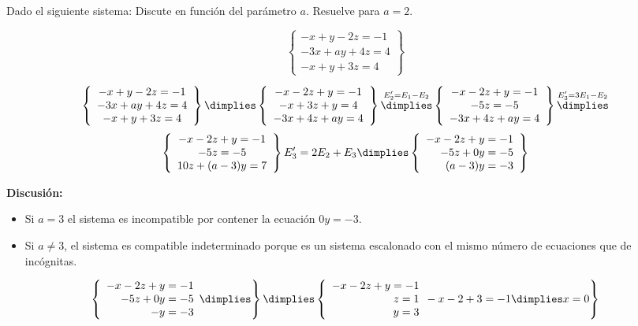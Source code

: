 \documentclass[palatino,nosec,nochap,nobuilddate]{Docencia}
\begin{document}
\begin{problem}
Dado el siguiente sistema:
\ppart Discute en función del parámetro $a$.
\ppart Resuelve para $a=2$.

\[
\left\{
	\begin{array}{c}
		-x+y-2z=-1\\
		-3x+ay+4z=4\\
		-x+y+3z=4
	\end{array}
\right\}
\]

\solution
\spart 
\[
\left\{
	\begin{array}{c}
		-x+y-2z=-1\\
		-3x+ay+4z=4\\
		-x+y+3z=4
	\end{array}
\right\}\dimplies
\left\{
	\begin{array}{c}
		-x-2z+y=-1\\
		-x+3z+y=4\\
		-3x+4z+ay=4
	\end{array}
\right\}\overset{E_2' = E_1-E_2}{\dimplies}
\left\{
	\begin{array}{c}
		-x-2z+y=-1\\
		-5z=-5\\
		-3x+4z+ay=4
	\end{array}
\right\}\overset{E_3' = 3E_1-E_2}{\dimplies}
\]
\[
\left\{
	\begin{array}{c}
		-x-2z+y=-1\\
		-5z=-5\\
		10z+(a-3)y=7
	\end{array}
\right\}{E_3' = 2E_2+E_3}{\dimplies}
\left\{
	\begin{array}{r}
		-x-2z+y=-1\\
		-5z+0y=-5\\
		(a-3)y=-3
	\end{array}
\right\}
\]

\textbf{Discusión:}
\begin{itemize}
	\item Si $a=3$ el sistema es incompatible por contener la ecuación $0y=-3$.
	\item Si $a\neq 3$, el sistema es compatible indeterminado porque es un sistema escalonado con el mismo número de ecuaciones que de incógnitas.
\end{itemize}

\spart 
\[
\left\{
	\begin{array}{r}
		-x-2z+y=-1\\
		-5z+0y=-5\\
		-y=-3
	\end{array} \dimplies
\right\}\dimplies
\left\{
	\begin{array}{r}
		-x-2z+y=-1\\
		z=1\\
		y=3
	\end{array} -x-2+3=-1 \dimplies x=0
\right\}
\]

\end{problem}
\end{document}
